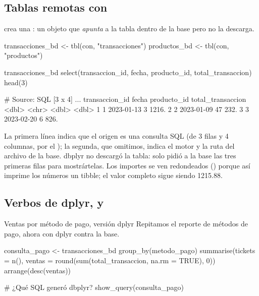 \subsection{Tablas remotas con \texorpdfstring{}{tbl()}}

 crea una : un objeto que
\emph{apunta} a la tabla dentro de la base pero no la descarga.

\begin{rcode}
transacciones_bd <- tbl(con, "transacciones")
productos_bd     <- tbl(con, "productos")

transacciones_bd %
  select(transaccion_id, fecha, producto_id, total_transaccion) %
  head(3)
\end{rcode}

\begin{rsalida}
# Source:   SQL [3 x 4]
...
  transaccion_id fecha      producto_id total_transaccion
           <dbl> <chr>            <dbl>             <dbl>
1              1 2023-01-13           3             1216.
2              2 2023-01-09          47              232.
3              3 2023-02-20           6              826.
\end{rsalida}

La primera línea indica que el origen es una consulta SQL (de 3 filas y 4
columnas, por el ); la segunda, que omitimos, indica el
motor y la ruta del archivo de la base. dbplyr no descargó la tabla: solo
pidió a la base las tres primeras filas para mostrártelas. Los importes se
ven redondeados () porque así imprime los números un tibble;
el valor completo sigue siendo 1215.88.

\subsection{Verbos de dplyr, \texorpdfstring{}{show\_query()} y \texorpdfstring{}{collect()}}

\begin{ejemplo}{Ventas por método de pago, versión dplyr}
Repitamos el reporte de métodos de pago, ahora con dplyr contra la base.
\end{ejemplo}

\begin{rcode}
consulta_pago <- transacciones_bd %
  group_by(metodo_pago) %
  summarise(tickets = n(),
            ventas  = round(sum(total_transaccion, na.rm = TRUE), 0)) %
  arrange(desc(ventas))

# ¿Qué SQL generó dbplyr?
show_query(consulta_pago)
\end{rcode}

